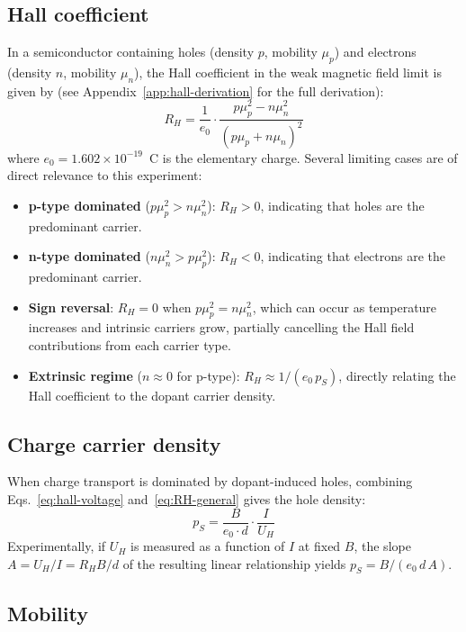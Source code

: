 \documentclass[%
 reprint,
 amsmath,amssymb,
 aps,
]{revtex4-2}
\begin{document}
\subsection{Hall coefficient}

In a semiconductor containing holes (density $p$, mobility $\mu_p$) and electrons (density $n$, mobility $\mu_n$), the Hall coefficient in the weak magnetic field limit is given by (see Appendix~\ref{app:hall-derivation} for the full derivation):
\begin{equation}
  R_H = \frac{1}{e_0} \cdot \frac{p\mu_p^2 - n\mu_n^2}{(p\mu_p + n\mu_n)^2}
  \label{eq:RH-general}
\end{equation}
where $e_0 = 1.602 \times 10^{-19}$~C is the elementary charge. Several limiting cases are of direct relevance to this experiment:
\begin{itemize}
  \item \textbf{p-type dominated} ($p\mu_p^2 > n\mu_n^2$): $R_H > 0$, indicating that holes are the predominant carrier.
  \item \textbf{n-type dominated} ($n\mu_n^2 > p\mu_p^2$): $R_H < 0$, indicating that electrons are the predominant carrier.
  \item \textbf{Sign reversal}: $R_H = 0$ when $p\mu_p^2 = n\mu_n^2$, which can occur as temperature increases and intrinsic carriers grow, partially cancelling the Hall field contributions from each carrier type.
  \item \textbf{Extrinsic regime} ($n \approx 0$ for p-type): $R_H \approx 1/(e_0 \, p_S)$, directly relating the Hall coefficient to the dopant carrier density.
\end{itemize}


\subsection{Charge carrier density}

When charge transport is dominated by dopant-induced holes, combining Eqs.~\eqref{eq:hall-voltage} and~\eqref{eq:RH-general} gives the hole density:
\begin{equation}
  p_S = \frac{B}{e_0 \cdot d} \cdot \frac{I}{U_H}
  \label{eq:carrier-density}
\end{equation}
Experimentally, if $U_H$ is measured as a function of $I$ at fixed $B$, the slope $A = U_H / I = R_H B / d$ of the resulting linear relationship yields $p_S = B / (e_0 \, d \, A)$.


\subsection{Mobility}
\end{document}
